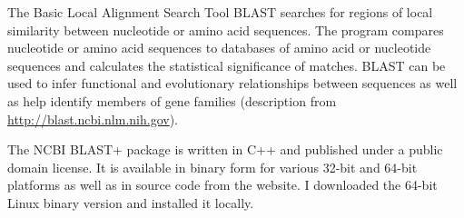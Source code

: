 The Basic Local Alignment Search Tool BLAST \citep{altschul1990} searches for
regions of local similarity between nucleotide or amino acid sequences. The
program compares nucleotide or amino acid sequences to databases of amino acid
or nucleotide sequences and calculates the statistical significance of matches.
BLAST can be used to infer functional and evolutionary relationships between
sequences as well as help identify members of gene families (description from
\url{http://blast.ncbi.nlm.nih.gov}).

The NCBI BLAST+ package is written in C++ and published under a public domain
license. It is available in binary form for various 32-bit and 64-bit platforms
as well as in source code from the  website. I downloaded the 64-bit Linux binary version
and installed it locally.
